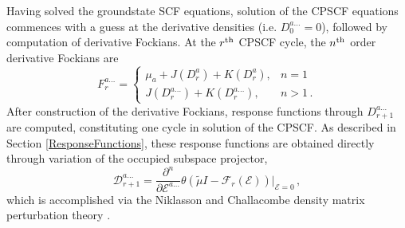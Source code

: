 \documentclass[prl,aps,preprint,showpacs,superbib]{revtex4}
\def\F{\mathcal{F}}
\def\D{\mathcal{D}}
\def\E{\mathcal{E}}
\begin{document}
Having solved the groundstate SCF equations, solution of the CPSCF equations commences with a guess at the 
derivative densities (i.e. $D^{a\ldots}_0=0$), followed by computation of derivative Fockians.  At the $r^{\rm th}$ 
CPSCF cycle, the $n^{\rm th}$ order derivative Fockians are 
\begin{equation}
    F^{a\ldots}_{r}= \left\{
    \begin{array}{ll}
      \mu_a+J(D^{a}_r)+K(D^{a}_r), & n=1\label{FockBuild}\\
      J(D^{a\ldots}_r)+K(D^{a\ldots}_r), & n>1 \,.
    \end{array}\right.
\end{equation}
After construction of the derivative Fockians, response functions through 
$D^{a\ldots}_{r+1}$ are computed, constituting one cycle in solution of the CPSCF.  
As described in Section \ref{ResponseFunctions},  these response functions are 
obtained directly through variation of the occupied subspace projector,  
\begin{equation}
    \displaystyle\D^{a\ldots}_{r+1}=
    \frac{\partial^n}{\partial\E^{a\ldots}}\theta(\tilde{\mu}I-
    \F_r(\E))\bigg|_{\E=0} \, , \label{DDeriv}
\end{equation}
which is accomplished via the Niklasson and Challacombe density matrix 
perturbation theory \cite{ANiklasson04}.  
\end{document}
